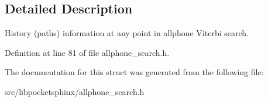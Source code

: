 \subsection{Detailed Description}
History (paths) information at any point in allphone Viterbi search. 

Definition at line 81 of file allphone\+\_\+search.\+h.



The documentation for this struct was generated from the following file\+:\begin{DoxyCompactItemize}
\item 
src/libpocketsphinx/allphone\+\_\+search.\+h\end{DoxyCompactItemize}

